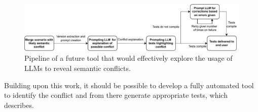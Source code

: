\begin{figure}[!t]
    \centering
    \includegraphics[width=1\linewidth]{figures/tool.pdf}
    \caption{Pipeline of a future tool that would effectively explore the usage
    of LLMs to reveal semantic conflicts.}
    \label{fig:tool}
\end{figure}

Building upon this work, it should be possible to develop a fully automated tool to identify the conflict and from there generate appropriate tests,
which  describes.
